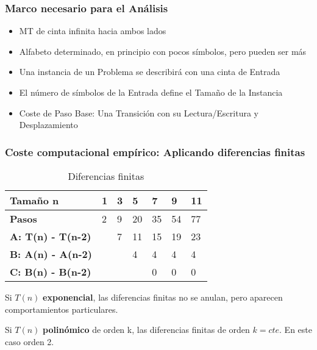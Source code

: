 \subsubsection{Marco necesario para el Análisis}
\begin{itemize}
    \item MT de cinta infinita hacia ambos lados
    \item Alfabeto determinado, en principio con pocos símbolos, pero pueden ser más
    \item Una instancia de un Problema se describirá con una cinta de Entrada
    \item El número de símbolos de la Entrada define el Tamaño de la Instancia
    \item Coste de Paso Base: Una Transición con su Lectura/Escritura y Desplazamiento
\end{itemize}

\subsubsection{Coste computacional empírico: Aplicando diferencias finitas}
\begin{table}[H]
    \begin{tabular}{|l|l|l|l|l|l|l|}
    \hline
    Tamaño n                  & \textbf{1} & \textbf{3} & \textbf{5} & \textbf{7} & \textbf{9} & \textbf{11} \\ \hline
    \textbf{Pasos}            & 2          & 9          & 20         & 35         & 54         & 77          \\ \hline
    \textbf{A: T(n) - T(n-2)} &            & 7          & 11         & 15         & 19         & 23          \\ \hline
    \textbf{B: A(n) - A(n-2)} &            &            & 4          & 4          & 4          & 4           \\ \hline
    \textbf{C: B(n) - B(n-2)} &            &            &            & 0          & 0          & 0           \\ \hline
    \end{tabular}
    \caption{Diferencias finitas}
\end{table}

Si $T(n)$ \textbf{exponencial}, las diferencias finitas no se anulan, pero aparecen comportamientos particulares.

Si $T(n)$ \textbf{polinómico} de orden k, las diferencias finitas de orden $k=cte$. En este caso orden 2.

